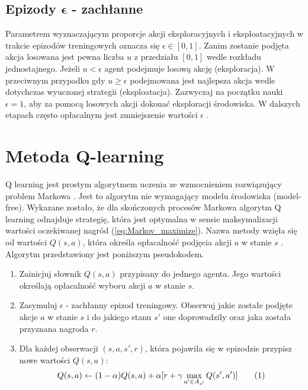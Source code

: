 \documentclass[12pt]{book}
\theoremstyle{plain}
\newcommand\addtag{\refstepcounter{equation}
\renewcommand{\labelenumii}{\theenumii}
\renewcommand{\theenumii}{\theenumi.\arabic{enumii}.}
\tag{\theequation}}
\newcommand{\myref}[1]{(\ref{#1})}
\begin{document}
\subsection*{Epizody $\mathbf{\epsilon}$ - zachłanne}
Parametrem wyznaczającym proporcje akcji eksploracyjnych i eksploatacyjnych w trakcie epizodów treningowych oznacza się $\epsilon \in [0,1]$. Zanim zostanie podjęta akcja losowana jest pewna liczba $u$ z przedziału $[0,1]$ wedle rozkładu jednostajnego. Jeżeli $u<\epsilon$ agent podejmuje losową akcję (eksploracja). W przeciwnym przypadku gdy $u \geq \epsilon$ podejmowana jest najlepsza akcja wedle dotychczas wyuczonej strategii (eksploatacja). Zazwyczaj na początku nauki $\epsilon=1$, aby za pomocą losowych akcji dokonać eksploracji środowiska. W dalszych etapach często opłacalnym jest zmniejszenie wartości $\epsilon$ \cite{epsilon_decay}.

\section{Metoda Q-learning}
Q learning jest prostym algorytmem uczenia ze wzmocnieniem rozwiązujący problem Markowa \cite{watkins}. Jest to algorytm nie wymagający modelu środowiska (model-free). Wykazane zostało\cite{q_zbieznosc}, że dla skończonych procesów Markowa algorytm Q learning odnajduje strategię, która jest optymalna w sensie maksymalizacji wartości oczekiwanej nagród \myref{eq:Markov_maximize}. Nazwa metody wzięła się od wartości $Q(s,a)$, która określa opłacalność podjęcia akcji $a$ w stanie $s$ \cite{nazwa_q}. Algorytm przedstawiony jest poniższym pseudokodem.
\begin{enumerate}
	\item Zainicjuj słownik
	$Q(s,a)$ przypisany do jednego agenta. Jego wartości określają opłacalność wyboru akcji $a$ w stanie $s$.
	\item Zasymuluj $\epsilon$ - zachłanny epizod treningowy. Obserwuj jakie zostałe podjęte akcje $a$ w stanie $s$ i do jakiego stanu $s'$ one doprowadziły oraz jaka została przyznana nagroda $r$.
	\item Dla każdej obserwacji $(s,a,s',r)$, która pojawiła się w epizodzie przypisz nowe wartości $Q(s,a)$:
	\[Q(s,a) \leftarrow (1-\alpha)Q(s,a) + \alpha [r + \gamma \max_{a' \in A_{s'}} Q(s',a')] \addtag \label{eq:q_rozwoj} \]
\end{enumerate}
\end{document}
